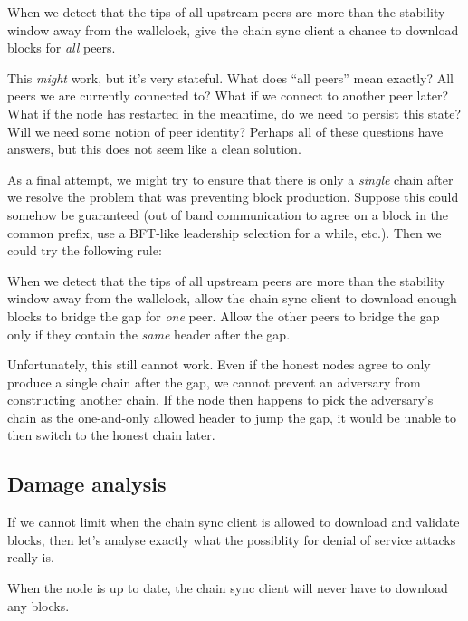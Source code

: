 \begin{failedattempt}
When we detect that the tips of all upstream peers are more than the stability
window away from the wallclock, give the chain sync client a chance to download
blocks for \emph{all} peers.
\end{failedattempt}

This \emph{might} work, but it's very stateful. What does ``all peers'' mean
exactly? All peers we are currently connected to? What if we connect to another
peer later? What if the node has restarted in the meantime, do we need to
persist this state? Will we need some notion of peer identity? Perhaps all of
these questions have answers, but this does not seem like a clean solution.

As a final attempt, we might try to ensure that there is only a \emph{single}
chain after we resolve the problem that was preventing block production.
Suppose this could somehow be guaranteed (out of band communication to agree on
a block in the common prefix, use a BFT-like leadership selection for a while,
etc.). Then we could try the following rule:

\begin{failedattempt}
When we detect that the tips of all upstream peers are more than the stability
window away from the wallclock, allow the chain sync client to download enough
blocks to bridge the gap for \emph{one} peer. Allow the other peers to bridge
the gap only if they contain the \emph{same} header after the gap.
\end{failedattempt}

Unfortunately, this still cannot work. Even if the honest nodes agree to only
produce a single chain after the gap, we cannot prevent an adversary from
constructing another chain. If the node then happens to pick the adversary's
chain as the one-and-only allowed header to jump the gap, it would be unable to
then switch to the honest chain later.

\pagebreak

\subsection{Damage analysis}

If we cannot limit when the chain sync client is allowed to download and
validate blocks, then let's analyse exactly what the possiblity for denial of
service attacks really is.

\begin{lemma}
When the node is up to date, the chain sync client will never have to download
any blocks.
\end{lemma}

